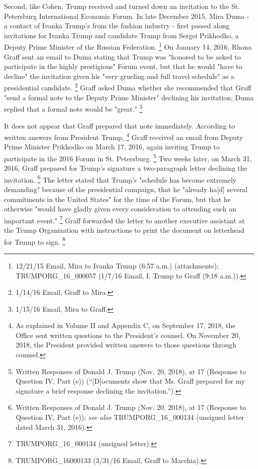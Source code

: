 Second, like Cohen, Trump received and turned down an invitation to the St. Petersburg International Economic Forum.
In late December 2015, Mira Duma - a contact of Ivanka Trump's from the fashion industry - first passed along invitations for Ivanka Trump and candidate Trump from Sergei Prikhodko, a Deputy Prime Minister of the Russian Federation.%
\footnote{12/21/15 Email, Mira to Ivanka Trump (6:57 a.m.) (attachments);
TRUMPORG\_16\_000057 (1/7/16 Email, I. Trump to Graff (9:18 a.m.)).}
On January 14, 2016, Rhona Graff sent an email to Duma stating that Trump was "honored to be asked to participate in the highly prestigious" Forum event, but that he would "have to decline" the invitation given his "very grueling and full travel schedule" as a presidential candidate.%
\footnote{1/14/16 Email, Graff to Mira.}
Graff asked Duma whether she recommended that Graff "send a formal note to the Deputy Prime Minister" declining his invitation; Duma replied that a formal note would be "great."%
\footnote{1/15/16 Email, Mira to Graff.}

It does not appear that Graff prepared that note immediately.
According to written answers from President Trump,%
\footnote{As explained in Volume II and Appendix C, on September 17, 2018, the Office sent written questions to the President’s counsel.
On November 20, 2018, the President provided written answers to those questions through counsel.}
Graff received an email from Deputy Prime Minister Prikhodko on March 17, 2016, again inviting Trump to participate in the 2016 Forum in St. Petersburg.%
\footnote{Written Responses of Donald J. Trump (Nov. 20, 2018), at 17 (Response to Question IV, Part (e)) (“[D]ocuments show that Ms. Graff prepared for my signature a brief response declining the invitation.”).}
Two weeks later, on March 31, 2016, Graff prepared for Trump's signature a two-paragraph letter declining the invitation.%
\footnote{Written Responses of Donald J. Trump (Nov. 20, 2018), at 17 (Response to Question IV, Part (e));
\textit{see also} TRUMPORG\_16\_000134 (unsigned letter dated March 31, 2016).}
The letter stated that Trump's "schedule has become extremely demanding" because of the presidential campaign, that he "already ha[d] several commitments in the United States" for the time of the Forum, but that he otherwise "would have gladly given every consideration to attending such an important event."%
\footnote{TRUMPORG\_16\_000134 (unsigned letter).}
Graff forwarded the letter to another executive assistant at the Trump Organization with instructions to print the document on letterhead for Trump to sign.%
\footnote{TRUMPORG_16000133 (3/31/16 Email, Graff to Macchia).}


